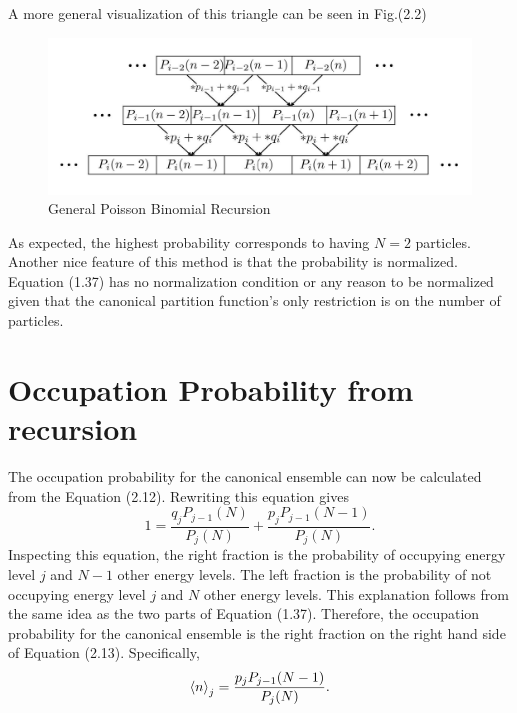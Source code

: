 A more general visualization of this triangle can be seen in Fig.(2.2)
\begin{figure}[H]
    \centering
    \includegraphics[scale=0.8]{figures/pdf/PBrecursion.jpg}
    \caption{General Poisson Binomial Recursion}
    \label{fig:General Poisson Binomial Recursion}
\end{figure}
As expected, the highest probability corresponds to having $N=2$ particles. Another nice feature of this method is that the probability is normalized. Equation (1.37) has no normalization condition or any reason to be normalized given that the canonical partition function's only restriction is on the number of particles.


\section{Occupation Probability from recursion}
The occupation probability for the canonical ensemble can now be calculated from the Equation (2.12). Rewriting this equation gives
\begin{equation}
    1=\frac{q_j P_{j-1}(N)}{P_j(N)} + \frac{p_j P_{j-1}(N-1)}{P_j(N)}.
\end{equation}
Inspecting this equation, the right fraction is the probability of occupying energy level $j$ and $N-1$ other energy levels. The left fraction is the probability of not occupying energy level $j$ and $N$ other energy levels. This explanation follows from the same idea as the two parts of Equation (1.37). Therefore, the occupation probability for the canonical ensemble is the right fraction on the right hand side of Equation (2.13). Specifically,
\begin{equation}
    \left<{n}\right>_j=\frac{p_j P_{j-1}(N-1)}{P_j(N)}.
\end{equation}

